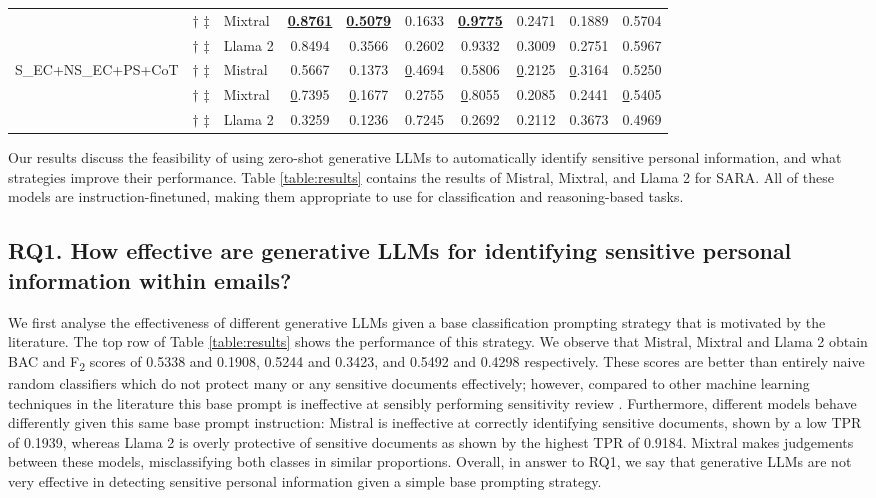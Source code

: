 \begin{table*}[!h]
\begin{tabular}{@{}lclccccccc@{}}
 &
  $\dagger$ $\ddagger$ &
  Mixtral &
  {\ul \textbf{0.8761}} &
  {\ul \textbf{0.5079}} &
  0.1633 &
  {\ul \textbf{0.9775}} &
  0.2471 &
  0.1889 &
  0.5704 \\
 &
  $\dagger$ $\ddagger$ &
  Llama 2 &
  0.8494 &
  0.3566 &
  0.2602 &
  0.9332 &
  0.3009 &
  0.2751 &
  0.5967 \\ \cmidrule(l){3-10}
\multirow{3}{*}{S\_EC+NS\_EC+PS+CoT} &
  $\dagger$ $\ddagger$ &
  Mistral &
  0.5667 &
  0.1373 &
  {\ul 0.4694} &
  0.5806 &
  {\ul 0.2125} &
  {\ul 0.3164} &
  0.5250 \\
 &
  $\dagger$ $\ddagger$ &
  Mixtral &
  {\ul 0.7395} &
  {\ul 0.1677} &
  0.2755 &
  {\ul 0.8055} &
  0.2085 &
  0.2441 &
  {\ul 0.5405} \\
 &
  $\dagger$ $\ddagger$ &
  Llama 2 &
  0.3259 &
  0.1236 &
  0.7245 &
  0.2692 &
  0.2112 &
  0.3673 &
  0.4969 \\ \cmidrule(l){1-10} 
\end{tabular}
\end{table*}

Our results discuss the feasibility of using zero-shot generative LLMs to automatically identify sensitive personal information, and what strategies improve their performance. Table \ref{table:results} contains the results of Mistral, Mixtral, and Llama 2 for SARA. All of these models are instruction-finetuned, making them appropriate to use for classification and reasoning-based tasks.

\subsection{RQ1. How effective are generative LLMs for identifying sensitive personal information within emails?}

We first analyse the effectiveness of different generative LLMs given a base classification prompting strategy that is motivated by the literature. The top row of Table \ref{table:results} shows the performance of this strategy. We observe that Mistral, Mixtral and Llama 2 obtain BAC and F\textsubscript{2} scores of 0.5338 and 0.1908, 0.5244 and 0.3423, and 0.5492 and 0.4298 respectively. These scores are better than entirely naive random classifiers which do not protect many or any sensitive documents effectively; however, compared to other machine learning techniques in the literature this base prompt is ineffective at sensibly performing sensitivity review \cite{mckechnie2024sara}. Furthermore, different models behave differently given this same base prompt instruction: Mistral is ineffective at correctly identifying sensitive documents, shown by a low TPR of 0.1939, whereas Llama 2 is overly protective of sensitive documents as shown by the highest TPR of 0.9184. Mixtral makes judgements between these models, misclassifying both classes in similar proportions. Overall, in answer to RQ1, we say that generative LLMs are not very effective in detecting sensitive personal information given a simple base prompting strategy.

